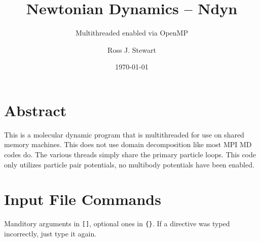 \documentclass[a4paper,11pt]{scrbook}              %
\begin{document}
\frontmatter                            %
\subject{Manual}
\title{Newtonian Dynamics -- Ndyn}    %
\subtitle{Multithreaded enabled via OpenMP}
\author{Ross J. Stewart}              %
\date{\today}                           %
\lowertitleback{This book was set with the help of {\KOMAScript} and {\LaTeX}}
\dedication{Dedicated to those who wish to learn how to use this program.}
\maketitle                              %
\tableofcontents                 

\chapter*{Abstract} %
This is a molecular dynamic program that is multithreaded for use on shared memory
 machines. This does not use domain decomposition like most MPI MD codes do.
The various threads simply share the primary particle loops.
This code only utilizes particle pair potentials, no multibody potentials have
 been enabled.

\mainmatter                             %

\chapter{Input File Commands}
Manditory arguments in \verb|[]|, optional ones in \verb|{}|.
If a directive was typed incorrectly, just type it again.
\end{document}
